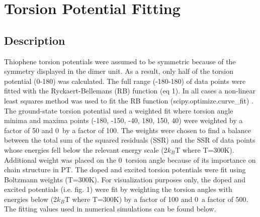 \clearpage

\section{Torsion Potential Fitting}
\label{sec:TPF}
\subsection{Description}
\label{subsec:TPF_descript}
Thiophene torsion potentials were assumed to be symmetric because of the symmetry displayed in the dimer unit. As a result, only half of the torsion potential (0-180\textdegree) was calculated. The full range (-180-180\textdegree) of data points were fitted with the Ryckaert-Bellemans (RB) function (eq 1). In all cases a non-linear least squares method was used to fit the RB function (scipy.optimize.curve\_fit) \cite{Jones}. The ground-state torsion potential used a weighted fit where torsion angle minima and maxima points (-180\textdegree, -150\textdegree, -40\textdegree, 180\textdegree, 150\textdegree, 40\textdegree) were weighted by a factor of 50 and 0\textdegree\ by a factor of 100. The weights were chosen to find a balance between the total sum of the squared residuals (SSR) and the SSR of data points whose energies fell below the relevant energy scale (2$k_B$T where T=300K). Additional weight was placed on the 0\textdegree\ torsion angle because of its importance on chain structure in PT. The doped and excited torsion potentials were fit using Boltzmann weights (T=300K). For visualization purposes only, the doped and excited potentials (i.e. fig. 1) were fit by weighting the torsion angles with energies below (2$k_B$T where T=300K) by a factor of 100 and 0\textdegree\ a factor of 500. The fitting values used in numerical simulations can be found below.

